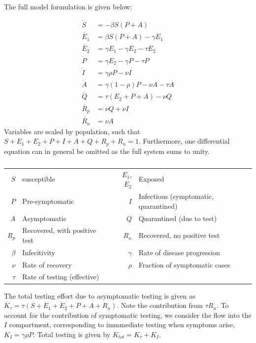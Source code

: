 \documentclass[10pt,a4paper]{article}
\begin{document}
The full model formulation is given below:

\begin{align}
    \dot{S} &= - \beta S (P+A) \\ \label{eq:modeldefinition}
    \dot{E_1} &= \beta S (P+A) - \gamma E_1 \\
    \dot{E_2} &= \gamma E_1 - \gamma E_2 - \tau E_2\\
    \dot{P} &= \gamma E_2 - \gamma P - \tau P\\
    \dot{I} &= \gamma \rho P - \nu I \\
    \dot{A} &= \gamma (1-\rho) P - \nu A -\tau A \\
    \dot{Q} &= \tau (E_2 + P + A) - \nu Q \\
    \dot{R_p} &= \nu Q + \nu I \\
    \dot{R_n} &= \nu A 
\end{align}
Variables are scaled by population, such that $S+E_1+E_2+P+I+A+Q+R_p+R_n = 1$. 
Furthermore, one differential equation can in general be omitted as the full system sums to unity.

\begin{table}[h!] \centering
    \label{tab:modeldesc}\caption{}
\begin{tabular}{|r|l||r|l|}
    \hline 
    $S$ & susceptible & $E_1$, $E_2$ & Exposed \\
    $P$ & Pre-symptomatic & $I$ & Infectious (symptomatic, quarantined) \\
    $A$ & Asymptomatic & $Q$ & Quarantined (due to test) \\
    $R_p$ & Recovered, with positive test & $R_n$ & Recovered, no positive test \\
    \hline \hline 
    $\beta$ & Infecitivity & $\gamma $ & Rate of disease progression \\
    $\nu $ & Rate of recovery & $\rho $ & Fraction of symptomatic cases \\
    $ \tau $ & Rate of testing (effective) && \\
    \hline 
\end{tabular}
\end{table}

The total testing effort due to asymptomatic testing is given as $K_{\tau} = \tau (S+E_1 + E_2 + P + A + R_n)$. Note the contribution from $\tau R_n$. To account for the contribution of symptomatic testing, we consider the flow into the $I$ compartment, corresponding to immmediate testing when symptoms arise, $K_I = \gamma \rho P$. 
Total testing is given by $K_{tot} = K_{\tau} + K_I$. 
\end{document}
